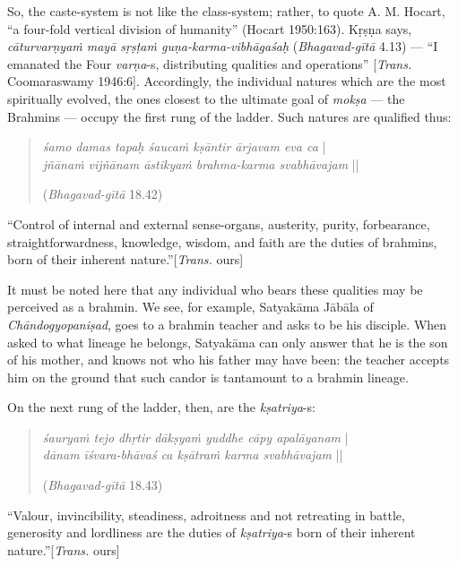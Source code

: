 So, the caste-system is not like the class-system; rather, to quote A. M. Hocart, “a four-fold vertical division of humanity” (Hocart 1950:163). Kṛṣṇa says, {\sl cāturvarṇyaṁ mayā sṛṣṭaṁ guṇa-karma-vibhāgaśaḥ} ({\sl Bhagavad-gītā} 4.13) --- ``I emanated the Four \hbox{{\sl varṇa}-s}, distributing qualities and operations'' [{\sl Trans.} Coomaraswamy 1946:6]. Accordingly, the individual natures which are the most spiritually evolved, the ones closest to the ultimate goal of {\sl mokṣa} --- the Brahmins --- occupy the first rung of the ladder. Such natures are qualified thus:
\begin{quote}
{{\sl śamo damas tapaḥ śaucaṁ kṣāntir ārjavam eva ca}} |\\
{\sl jñānaṁ vijñānam āstikyaṁ brahma-karma svabhāvajam} || 

\hfill ({\sl Bhagavad-gītā} 18.42)
\end{quote}

\begin{myquote}
“Control of internal and external sense-organs, austerity, purity, forbearance, straightforwardness, knowledge, wisdom, and faith are the duties of brahmins, born of their inherent nature.”\hfill [{\sl Trans.} ours]
\end{myquote}

It must be noted here that any individual who bears these qualities may be perceived as a brahmin. We see, for example, Satyakāma Jābāla of {\sl Chāndogyopaniṣad}, goes to a brahmin teacher and asks to be his disciple. When asked to what lineage he belongs, Satyakāma can only answer that he is the son of his mother, and knows not who his father may have been: the teacher accepts him on the ground that such candor is tantamount to a brahmin lineage. 

On the next rung of the ladder, then, are the {\sl kṣatriya}-s:
\begin{quote}
{{\sl śauryaṁ tejo dhṛtir dākṣyaṁ yuddhe cāpy apalāyanam}} |\\
{\sl dānam īśvara-bhāvaś ca kṣātraṁ karma svabhāvajam} || 

\hfill ({\sl Bhagavad-gītā} 18.43)
\end{quote}

\begin{myquote}
“Valour, invincibility, steadiness, adroitness and not retreating in battle, generosity and lordliness are the duties of {\sl kṣatriya}-s born of their inherent nature.”\hfill [{\sl Trans.} ours]
\end{myquote}

